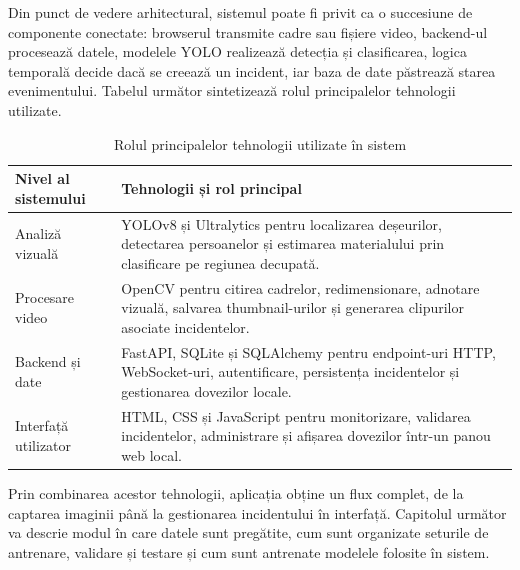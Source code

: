 Din punct de vedere arhitectural, sistemul poate fi privit ca o succesiune de componente conectate: browserul transmite cadre sau fișiere video, backend-ul procesează datele, modelele YOLO realizează detecția și clasificarea, logica temporală decide dacă se creează un incident, iar baza de date păstrează starea evenimentului. Tabelul următor sintetizează rolul principalelor tehnologii utilizate.

\begin{table}[!htbp]
\centering
\footnotesize
\begin{tabular}{|>{\raggedright\arraybackslash}p{4.1cm}|>{\raggedright\arraybackslash}p{9.6cm}|}
\hline
\textbf{Nivel al sistemului} & \textbf{Tehnologii și rol principal} \\
\hline
Analiză vizuală & YOLOv8 și Ultralytics pentru localizarea deșeurilor, detectarea persoanelor și estimarea materialului prin clasificare pe regiunea decupată. \\
\hline
Procesare video & OpenCV pentru citirea cadrelor, redimensionare, adnotare vizuală, salvarea thumbnail-urilor și generarea clipurilor asociate incidentelor. \\
\hline
Backend și date & FastAPI, SQLite și SQLAlchemy pentru endpoint-uri HTTP, WebSocket-uri, autentificare, persistența incidentelor și gestionarea dovezilor locale. \\
\hline
Interfață utilizator & HTML, CSS și JavaScript pentru monitorizare, validarea incidentelor, administrare și afișarea dovezilor într-un panou web local. \\
\hline
\end{tabular}
\caption{Rolul principalelor tehnologii utilizate în sistem}
\end{table}

Prin combinarea acestor tehnologii, aplicația obține un flux complet, de la captarea imaginii până la gestionarea incidentului în interfață. Capitolul următor va descrie modul în care datele sunt pregătite, cum sunt organizate seturile de antrenare, validare și testare și cum sunt antrenate modelele folosite în sistem.
